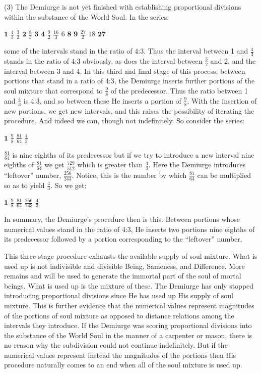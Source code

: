 (3) The Demiurge is not yet finished with establishing proportional divisions within the substance of the World Soul. In the series: 
\begin{center}
	\( \mathbf{1} \) \( \frac{4}{3} \) \( \frac{3}{2} \) \( \mathbf{2} \) \( \frac{8}{3} \) \( \mathbf{3} \) \( \mathbf{4} \) \( \frac{9}{2} \) \( \frac{16}{3} \) \( 6 \) \( \mathbf{8} \) \( \mathbf{9} \) \( \frac{27}{2} \) \( 18 \) \( \mathbf{27} \)
\end{center}
some of the intervals stand in the ratio of 4:3. Thus the interval between 1 and \( \frac{4}{3} \) stands in the ratio of 4:3 obviously, as does the interval between \( \frac{3}{2} \) and 2, and the interval between 3 and 4. In this third and final stage of this process, between portions that stand in a ratio of 4:3, the Demiurge inserts further portions of the soul mixture that correspond to \( \frac{9}{8} \) of the predecessor. Thus the ratio between 1 and \( \frac{4}{3} \) is 4:3, and so between these He inserts a portion of \( \frac{9}{8} \). With the insertion of new portions, we get new intervals, and this raises the possibility of iterating the procedure. And indeed we can, though not indefinitely. So consider the series:
\begin{center}
	\( \mathbf{1} \) \( \frac{9}{8} \) \( \frac{81}{64} \) \( \frac{4}{3} \)
\end{center}
\( \frac{81}{64} \) is nine eighths of its predecessor but if we try to introduce a new interval nine eighths of \( \frac{81}{64} \) we get \( \frac{729}{512} \) which is greater than \( \frac{4}{3} \). Here the Demiurge introduces ``leftover'' number, \( \frac{256}{243} \). Notice, this is the number by which \( \frac{81}{64} \) can be multiplied so as to yield \( \frac{4}{3} \). So we get:
\begin{center}
	\( \mathbf{1} \) \( \frac{9}{8} \) \( \frac{81}{64} \) \( \frac{256}{243} \) \( \frac{4}{3} \)
\end{center}
In summary, the Demiurge's procedure then is this. Between portions whose numerical values stand in the ratio of 4:3, He inserts two portions nine eighths of its predecessor followed by a portion corresponding to the ``leftover'' number.

This three stage procedure exhausts the available supply of soul mixture. What is used up is not indivisible and divisible Being, Sameness, and Difference. More remains and will be used to generate the immortal part of the soul of mortal beings. What is used up is the mixture of these. The Demiurge has only stopped introducing proportional divisions since He has used up His supply of soul mixture. This is further evidence that the numerical values represent magnitudes of the portions of soul mixture as opposed to distance relations among the intervals they introduce. If the Demiurge was scoring proportional divisions into the substance of the World Soul in the manner of a carpenter or mason, there is no reason why the subdivision could not continue indefinitely. But if the numerical values represent instead the magnitudes of the portions then His procedure naturally comes to an end when all of the soul mixture is used up.

